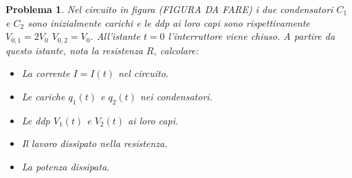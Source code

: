 \documentclass[a4paper,oneside]{article}
\newtheorem{problema}{Problema}
\begin{document}
\begin{problema}
	Nel circuito in figura (FIGURA DA FARE) i due condensatori $C_1$ e $C_2$ sono inizialmente 
	carichi e le ddp ai loro capi sono rispettivamente $V_{0,1} = 2V_0$ $V_{0,2} = V_0$. 
	All'istante $t=0$ l'interruttore viene chiuso. A partire da questo istante, nota la 
	resistenza $R$, calcolare:
	\begin{itemize}
		\item La corrente $I = I(t)$ nel circuito.
		\item Le cariche $q_1(t)$ e $q_2(t)$ nei condensatori.
		\item Le ddp $V_1(t)$ e $V_2(t)$ ai loro capi.
		\item Il lavoro dissipato nella resistenza.
		\item La potenza dissipata.
	\end{itemize}
\end{problema}
\end{document}
